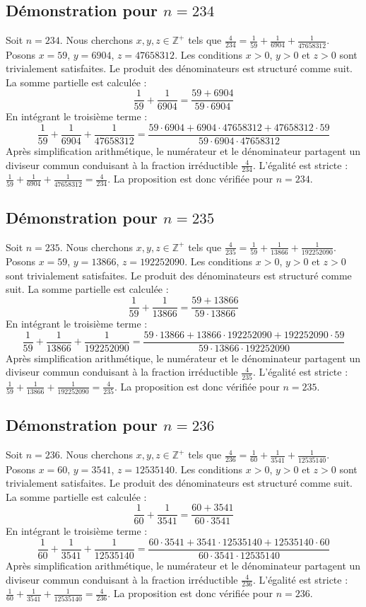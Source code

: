\documentclass[11pt,a4paper]{article}
\begin{document}
\subsection{Démonstration pour $n = 234$}
Soit $n = 234$. Nous cherchons $x, y, z \in \mathbb{Z}^{+}$ tels que $\frac{4}{234} = \frac{1}{59} + \frac{1}{6904} + \frac{1}{47658312}$.
Posons $x = 59$, $y = 6904$, $z = 47658312$.
Les conditions $x > 0$, $y > 0$ et $z > 0$ sont trivialement satisfaites.
Le produit des dénominateurs est structuré comme suit. La somme partielle est calculée :
$$ \frac{1}{59} + \frac{1}{6904} = \frac{59+6904}{59 \cdot 6904} $$
En intégrant le troisième terme :
$$ \frac{1}{59} + \frac{1}{6904} + \frac{1}{47658312} = \frac{59 \cdot 6904 + 6904 \cdot 47658312 + 47658312 \cdot 59}{59 \cdot 6904 \cdot 47658312} $$
Après simplification arithmétique, le numérateur et le dénominateur partagent un diviseur commun conduisant à la fraction irréductible $\frac{4}{234}$.
L'égalité est stricte : $\frac{1}{59} + \frac{1}{6904} + \frac{1}{47658312} = \frac{4}{234}$.
La proposition est donc vérifiée pour $n = 234$.
\subsection{Démonstration pour $n = 235$}
Soit $n = 235$. Nous cherchons $x, y, z \in \mathbb{Z}^{+}$ tels que $\frac{4}{235} = \frac{1}{59} + \frac{1}{13866} + \frac{1}{192252090}$.
Posons $x = 59$, $y = 13866$, $z = 192252090$.
Les conditions $x > 0$, $y > 0$ et $z > 0$ sont trivialement satisfaites.
Le produit des dénominateurs est structuré comme suit. La somme partielle est calculée :
$$ \frac{1}{59} + \frac{1}{13866} = \frac{59+13866}{59 \cdot 13866} $$
En intégrant le troisième terme :
$$ \frac{1}{59} + \frac{1}{13866} + \frac{1}{192252090} = \frac{59 \cdot 13866 + 13866 \cdot 192252090 + 192252090 \cdot 59}{59 \cdot 13866 \cdot 192252090} $$
Après simplification arithmétique, le numérateur et le dénominateur partagent un diviseur commun conduisant à la fraction irréductible $\frac{4}{235}$.
L'égalité est stricte : $\frac{1}{59} + \frac{1}{13866} + \frac{1}{192252090} = \frac{4}{235}$.
La proposition est donc vérifiée pour $n = 235$.
\subsection{Démonstration pour $n = 236$}
Soit $n = 236$. Nous cherchons $x, y, z \in \mathbb{Z}^{+}$ tels que $\frac{4}{236} = \frac{1}{60} + \frac{1}{3541} + \frac{1}{12535140}$.
Posons $x = 60$, $y = 3541$, $z = 12535140$.
Les conditions $x > 0$, $y > 0$ et $z > 0$ sont trivialement satisfaites.
Le produit des dénominateurs est structuré comme suit. La somme partielle est calculée :
$$ \frac{1}{60} + \frac{1}{3541} = \frac{60+3541}{60 \cdot 3541} $$
En intégrant le troisième terme :
$$ \frac{1}{60} + \frac{1}{3541} + \frac{1}{12535140} = \frac{60 \cdot 3541 + 3541 \cdot 12535140 + 12535140 \cdot 60}{60 \cdot 3541 \cdot 12535140} $$
Après simplification arithmétique, le numérateur et le dénominateur partagent un diviseur commun conduisant à la fraction irréductible $\frac{4}{236}$.
L'égalité est stricte : $\frac{1}{60} + \frac{1}{3541} + \frac{1}{12535140} = \frac{4}{236}$.
La proposition est donc vérifiée pour $n = 236$.
\end{document}
